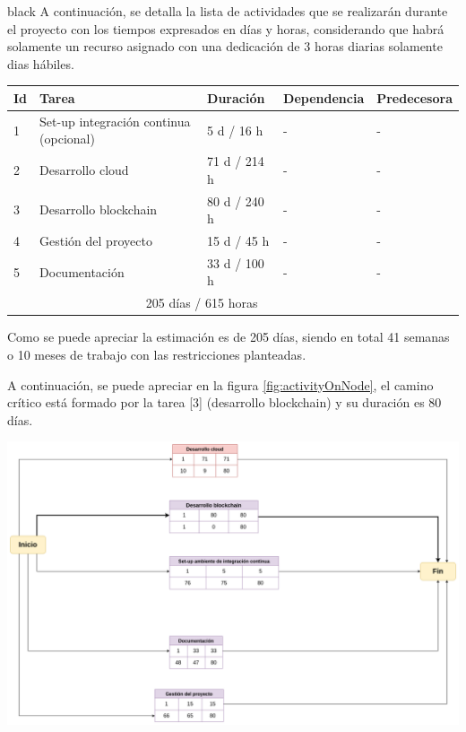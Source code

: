 \documentclass[
11pt, %
]{charter}
\begin{document}
\begin{consigna}{black}
A continuación, se detalla la lista de actividades que se realizarán durante el proyecto con los tiempos expresados en días y horas, considerando que habrá solamente un recurso asignado con una dedicación de 3 horas diarias solamente dias hábiles.

\begin{table}[ht]
\begin{tabularx}{\linewidth}{@{}|l|X|l|l|l|@{}}
\hline
\rowcolor[HTML]{C0C0C0}
Id	& Tarea           						& Duración 	& Dependencia	& Predecesora 	\\ \hline
1	& Set-up integración continua (opcional)	& 5 d / 16 h 		& -        		&  -				\\ \hline
2	& Desarrollo cloud						& 71 d / 214 h		& -				&  -      		\\ \hline
3	& Desarrollo blockchain    				& 80 d / 240 h		& -			 	& -			\\ \hline
4	& Gestión del proyecto 					& 15 d / 45 h		& -				&  - 			\\ \hline
5	& Documentación    						& 33 d / 100 h		& -			 	& -				\\ \hline
\rowcolor[HTML]{C0C0C0}
\multicolumn{2}{|c|}{TOTAL} & \multicolumn{3}{c|}{ 205 días / 615 horas}  \\ \hline
\end{tabularx}
\end{table}

Como se puede apreciar la estimación es de 205 días, siendo en total 41 semanas o 10 meses de trabajo con las restricciones planteadas.

A continuación, se puede apreciar en la figura \ref{fig:activityOnNode}, el camino crítico está formado por la tarea [3] (desarrollo blockchain) y su duración es 80 días.

\begin{center}
 \includegraphics[scale=0.30]{./Figuras/activity-on-node}
 \label{fig:activityOnNode}
\end{center}
\end{consigna}
\end{document}
